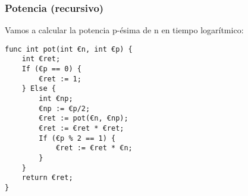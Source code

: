 \documentclass[spanish, a4paper, 12pt] {article}
\begin{document}
\subsubsection*{Potencia (recursivo)}
Vamos a calcular la potencia p-ésima de n en tiempo logarítmico:
\begin{verbatim}
func int pot(int €n, int €p) {
    int €ret;
    If (€p == 0) {
        €ret := 1;
    } Else {
        int €np;
        €np := €p/2;
        €ret := pot(€n, €np);
        €ret := €ret * €ret;
        If (€p % 2 == 1) {
            €ret := €ret * €n;
        }
    }
    return €ret;
}
\end{verbatim}
\end{document}
